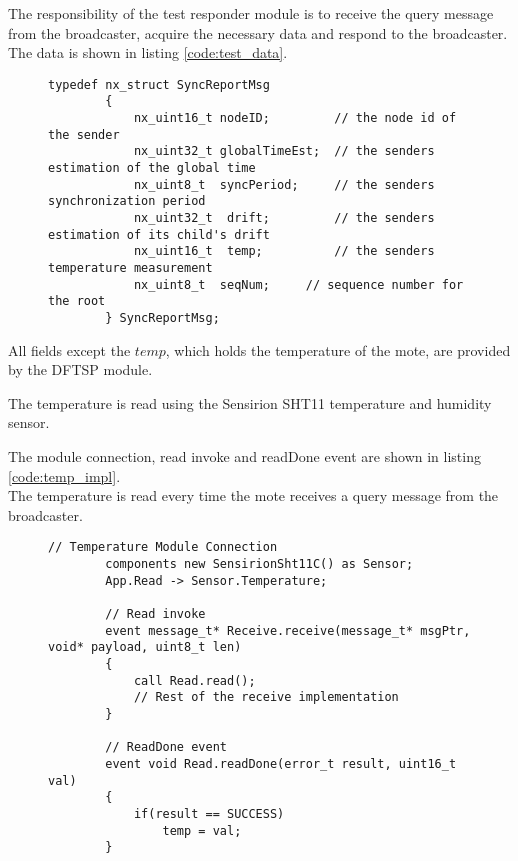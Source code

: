 \documentclass[Main]{subfiles}
\begin{document}
				The responsibility of the test responder module is to receive the query message from the broadcaster, acquire the necessary data and respond to the broadcaster.
				The data is shown in listing \ref{code:test_data}.

				\begin{figure}[H]
					\begin{lstlisting}[caption=DFTSP Test Data, style=Code-C, label=code:test_data]
		typedef nx_struct SyncReportMsg
		{
			nx_uint16_t	nodeID;			// the node id of the sender
			nx_uint32_t	globalTimeEst;	// the senders estimation of the global time
			nx_uint8_t  syncPeriod;		// the senders synchronization period
			nx_uint32_t  drift;			// the senders estimation of its child's drift
			nx_uint16_t  temp;			// the senders temperature measurement
			nx_uint8_t	seqNum;		// sequence number for the root
		} SyncReportMsg;

					\end{lstlisting}
				\end{figure}

				All fields except the $temp$, which holds the temperature of the mote, are provided by the DFTSP module.

				The temperature is read using the Sensirion SHT11\cite{tempSensorDatasheet} temperature and humidity sensor.

				The module connection, read invoke and readDone event are shown in listing \ref{code:temp_impl}.
				\\The temperature is read every time the mote receives a query message from the broadcaster.

				\begin{figure}[H]
					\begin{lstlisting}[caption=Temperature reading implementation, style=Code-C, label=code:temp_impl]
		// Temperature Module Connection
		components new SensirionSht11C() as Sensor;
		App.Read -> Sensor.Temperature;

		// Read invoke
		event message_t* Receive.receive(message_t* msgPtr, void* payload, uint8_t len)
		{
	    	call Read.read();
	    	// Rest of the receive implementation
		}

		// ReadDone event
		event void Read.readDone(error_t result, uint16_t val)
		{
			if(result == SUCCESS)
				temp = val;
		}

						\end{lstlisting}
				\end{figure}
		
\end{document}
